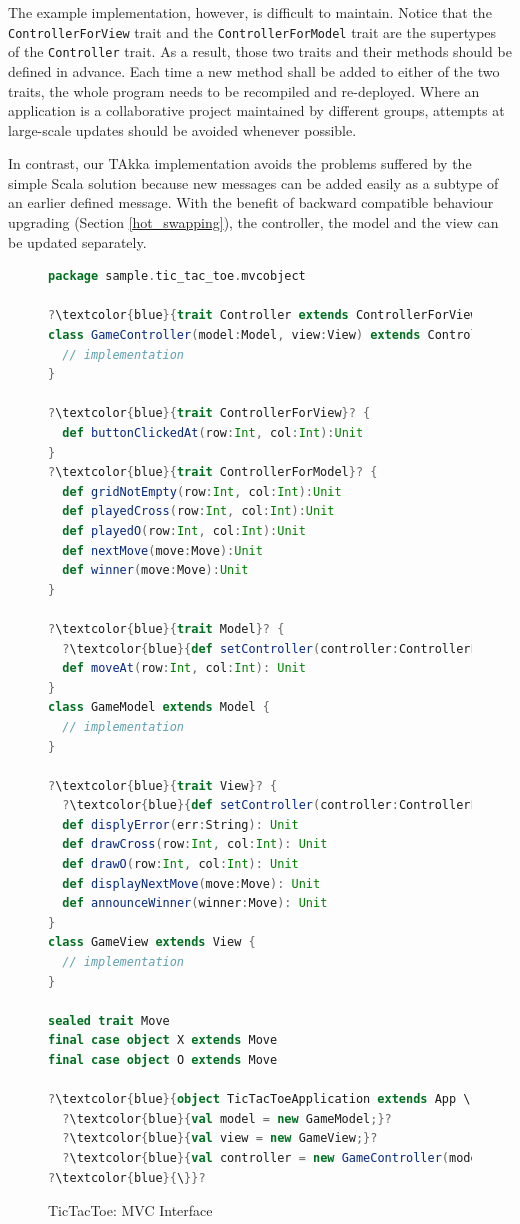 The example implementation, however, is difficult to maintain.  Notice that the 
{\tt ControllerForView} trait and the {\tt ControllerForModel} trait are the 
supertypes of the {\tt Controller} trait.  As a result, those two traits 
and their methods should be defined in advance.  Each time a new 
method shall be added to either of the two traits, 
the whole program needs to be recompiled and re-deployed.  Where an application 
is a collaborative project maintained by different groups, attempts at 
large-scale updates should be avoided whenever possible.  

In contrast, our TAkka implementation avoids the problems suffered by the simple
Scala solution because new messages can be added easily as a subtype
of an earlier defined message.   With the benefit of backward compatible behaviour upgrading (Section 
\ref{hot_swapping}), the controller, the model and the view can be updated 
separately.




\begin{figure}[p]
\begin{lstlisting}[language=scala, escapechar=?]
package sample.tic_tac_toe.mvcobject

?\textcolor{blue}{trait Controller extends ControllerForView with ControllerForModel}?
class GameController(model:Model, view:View) extends Controller {
  // implementation
}

?\textcolor{blue}{trait ControllerForView}? {
  def buttonClickedAt(row:Int, col:Int):Unit
}
?\textcolor{blue}{trait ControllerForModel}? {
  def gridNotEmpty(row:Int, col:Int):Unit
  def playedCross(row:Int, col:Int):Unit
  def playedO(row:Int, col:Int):Unit
  def nextMove(move:Move):Unit
  def winner(move:Move):Unit
}

?\textcolor{blue}{trait Model}? {
  ?\textcolor{blue}{def setController(controller:ControllerForModel): Unit}?
  def moveAt(row:Int, col:Int): Unit
}
class GameModel extends Model {
  // implementation
}

?\textcolor{blue}{trait View}? {
  ?\textcolor{blue}{def setController(controller:ControllerForView): Unit}?
  def displyError(err:String): Unit
  def drawCross(row:Int, col:Int): Unit
  def drawO(row:Int, col:Int): Unit
  def displayNextMove(move:Move): Unit
  def announceWinner(winner:Move): Unit
}
class GameView extends View {
  // implementation
}

sealed trait Move
final case object X extends Move
final case object O extends Move

?\textcolor{blue}{object TicTacToeApplication extends App \{}?
  ?\textcolor{blue}{val model = new GameModel;}?
  ?\textcolor{blue}{val view = new GameView;}?
  ?\textcolor{blue}{val controller = new GameController(model, view)  }?
?\textcolor{blue}{\}}?
\end{lstlisting}
\caption{TicTacToe: MVC Interface}
\label{TTT_interface}
\end{figure}

